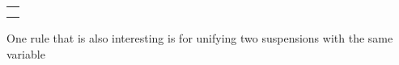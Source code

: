 \begin{isabellebody}
\begin{isamarkuptext}
  \begin{center}
  \begin{tabular}{l}
  \isa{{\isaliteral{7B}{\isacharbraceleft}}a{\isaliteral{2E}{\isachardot}}t\ {\isaliteral{5C3C617070726F783E}{\isasymapprox}}\isaliteral{5C3C5E7375703E}{}\isactrlsup {\isaliteral{3F}{\isacharquery}}\ a{\isaliteral{2E}{\isachardot}}s{\isaliteral{2C}{\isacharcomma}}\ {\isaliteral{5C3C646F74733E}{\isasymdots}}{\isaliteral{7D}{\isacharbraceright}}\ {\isaliteral{5C3C4C6F6E6772696768746172726F773E}{\isasymLongrightarrow}}\ {\isaliteral{7B}{\isacharbraceleft}}t\ {\isaliteral{5C3C617070726F783E}{\isasymapprox}}\isaliteral{5C3C5E7375703E}{}\isactrlsup {\isaliteral{3F}{\isacharquery}}\ s{\isaliteral{2C}{\isacharcomma}}\ {\isaliteral{5C3C646F74733E}{\isasymdots}}{\isaliteral{7D}{\isacharbraceright}}}\\
  \isa{{\isaliteral{7B}{\isacharbraceleft}}a{\isaliteral{2E}{\isachardot}}t\ {\isaliteral{5C3C617070726F783E}{\isasymapprox}}\isaliteral{5C3C5E7375703E}{}\isactrlsup {\isaliteral{3F}{\isacharquery}}\ b{\isaliteral{2E}{\isachardot}}s{\isaliteral{2C}{\isacharcomma}}\ {\isaliteral{5C3C646F74733E}{\isasymdots}}{\isaliteral{7D}{\isacharbraceright}}\ {\isaliteral{5C3C4C6F6E6772696768746172726F773E}{\isasymLongrightarrow}}\ {\isaliteral{7B}{\isacharbraceleft}}t\ {\isaliteral{5C3C617070726F783E}{\isasymapprox}}\isaliteral{5C3C5E7375703E}{}\isactrlsup {\isaliteral{3F}{\isacharquery}}\ {\isaliteral{28}{\isacharparenleft}}a\ b{\isaliteral{29}{\isacharparenright}}\ {\isaliteral{5C3C62756C6C65743E}{\isasymbullet}}\ s{\isaliteral{2C}{\isacharcomma}}\ a\ {\isaliteral{23}{\isacharhash}}\isaliteral{5C3C5E7375703E}{}\isactrlsup {\isaliteral{3F}{\isacharquery}}\ s{\isaliteral{2C}{\isacharcomma}}\ {\isaliteral{5C3C646F74733E}{\isasymdots}}{\isaliteral{7D}{\isacharbraceright}}}
  \end{tabular}
  \end{center}

  \noindent
  One rule that is also interesting is for unifying two suspensions with
  the same variable


\end{isamarkuptext}
\end{isabellebody}
